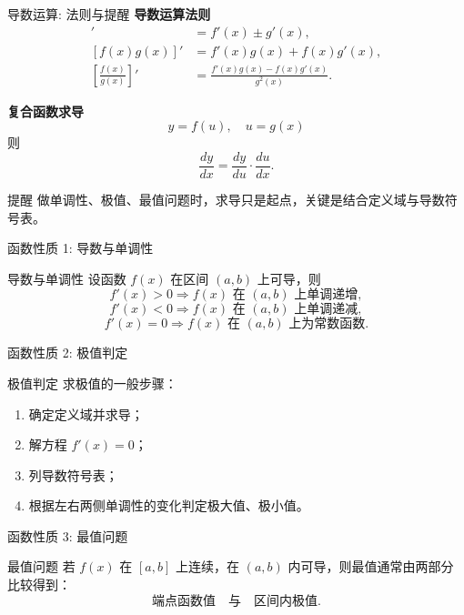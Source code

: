 ﻿\documentclass[aspectratio=169,10pt]{ctexbeamer}
\newcommand{\topic}[1]{\textcolor{blue!70!black}{\textbf{#1}}}
\newcommand{\sep}{\vspace{0.35em}}
\begin{document}
\begin{frame}[t]{导数运算: 法则与提醒}
\small
\topic{导数运算法则}
\begin{align*}
[f(x)\pm g(x)]'&=f'(x)\pm g'(x),\\
[f(x)g(x)]'&=f'(x)g(x)+f(x)g'(x),\\
\left[\frac{f(x)}{g(x)}\right]'&=
\frac{f'(x)g(x)-f(x)g'(x)}{g^2(x)}.
\end{align*}

\sep
\topic{复合函数求导}
\[
y=f(u),\quad u=g(x)
\]
则
\[
\frac{dy}{dx}=\frac{dy}{du}\cdot\frac{du}{dx}.
\]

\sep
\begin{alertblock}{提醒}
做单调性、极值、最值问题时，求导只是起点，关键是结合定义域与导数符号表。
\end{alertblock}
\end{frame}

\begin{frame}[t]{函数性质 1: 导数与单调性}
\small
\begin{block}{导数与单调性}
设函数 $f(x)$ 在区间 $(a,b)$ 上可导，则
\[
f'(x)>0\Rightarrow f(x)\text{ 在 }(a,b)\text{ 上单调递增},
\]
\[
f'(x)<0\Rightarrow f(x)\text{ 在 }(a,b)\text{ 上单调递减},
\]
\[
f'(x)=0\Rightarrow f(x)\text{ 在 }(a,b)\text{ 上为常数函数}.
\]
\end{block}
\end{frame}

\begin{frame}[t]{函数性质 2: 极值判定}
\small
\begin{block}{极值判定}
求极值的一般步骤：
\begin{enumerate}
  \item 确定定义域并求导；
  \item 解方程 $f'(x)=0$；
  \item 列导数符号表；
  \item 根据左右两侧单调性的变化判定极大值、极小值。
\end{enumerate}
\end{block}
\end{frame}

\begin{frame}[t]{函数性质 3: 最值问题}
\small
\begin{block}{最值问题}
若 $f(x)$ 在 $[a,b]$ 上连续，在 $(a,b)$ 内可导，则最值通常由两部分比较得到：
\[
\text{端点函数值}\quad \text{与}\quad \text{区间内极值}.
\]
\end{block}
\end{frame}
\end{document}
